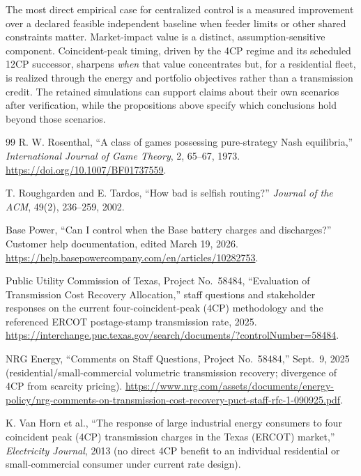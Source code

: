 \documentclass[11pt]{article}
\theoremstyle{remark}
\begin{document}
The most direct empirical case for centralized control is a measured
improvement over a declared feasible independent baseline when feeder limits
or other shared constraints matter. Market-impact value is a distinct,
assumption-sensitive component. Coincident-peak timing, driven by the
4CP regime and its scheduled 12CP successor, sharpens \emph{when} that value
concentrates but, for a residential fleet, is realized through the energy and
portfolio objectives rather than a transmission credit. The retained
simulations can support claims about their own scenarios after verification,
while the propositions above specify which conclusions hold beyond those
scenarios.

\appendix


\begin{thebibliography}{99}
R. W. Rosenthal, ``A class of games possessing pure-strategy Nash
equilibria,'' \emph{International Journal of Game Theory}, 2, 65--67, 1973.
\url{https://doi.org/10.1007/BF01737559}.

T. Roughgarden and E. Tardos, ``How bad is selfish routing?''
\emph{Journal of the ACM}, 49(2), 236--259, 2002.

Base Power, ``Can I control when the Base battery charges and discharges?''
Customer help documentation, edited March 19, 2026.
\url{https://help.basepowercompany.com/en/articles/10282753}.

Public Utility Commission of Texas, Project No.~58484, ``Evaluation of
Transmission Cost Recovery Allocation,'' staff questions and stakeholder
responses on the current four-coincident-peak (4CP) methodology and the
referenced ERCOT postage-stamp transmission rate, 2025.
\url{https://interchange.puc.texas.gov/search/documents/?controlNumber=58484}.

NRG Energy, ``Comments on Staff Questions, Project No.~58484,'' Sept.~9, 2025
(residential/small-commercial volumetric transmission recovery; divergence of
4CP from scarcity pricing).
\url{https://www.nrg.com/assets/documents/energy-policy/nrg-comments-on-transmission-cost-recovery-puct-staff-rfc-1-090925.pdf}.

K. Van Horn et al., ``The response of large industrial energy consumers to
four coincident peak (4CP) transmission charges in the Texas (ERCOT) market,''
\emph{Electricity Journal}, 2013 (no direct 4CP benefit to an individual
residential or small-commercial consumer under current rate design).


\end{thebibliography}
\end{document}

